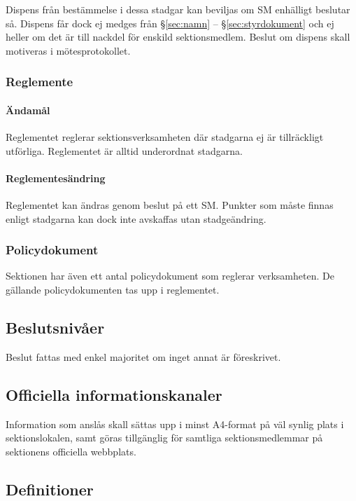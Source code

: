 \documentclass{dgovdoc}
\begin{document}
Dispens från bestämmelse i dessa stadgar kan beviljas om SM enhälligt beslutar
så. Dispens får dock ej medges från \S\ref{sec:namn} -- \S\ref{sec:styrdokument}
och ej heller om det är till nackdel för enskild sektionsmedlem. Beslut om
dispens skall motiveras i mötesprotokollet.

\subsubsection{Reglemente}

\paragraph{Ändamål}

Reglementet reglerar sektionsverksamheten där stadgarna ej är tillräckligt
utförliga. Reglementet är alltid underordnat stadgarna.

\paragraph{Reglementesändring}

Reglementet kan ändras genom beslut på ett SM. Punkter som måste finnas enligt
stadgarna kan dock inte avskaffas utan stadgeändring.

\subsubsection{Policydokument}

Sektionen har även ett antal policydokument
som reglerar verksamheten. De gällande policydokumenten tas upp i reglementet.

\subsection{Beslutsnivåer}

Beslut fattas med enkel majoritet om inget annat är föreskrivet.

\subsection{Officiella informationskanaler}
\label{sec:officiella_informationskanaler}

Information som anslås skall sättas upp i minst A4-format på väl synlig plats i
sektionslokalen, samt göras tillgänglig för samtliga sektionsmedlemmar på
sektionens officiella webbplats.

\subsection{Definitioner}
\end{document}
